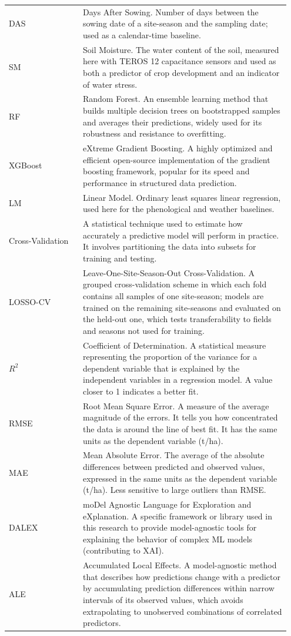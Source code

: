 \documentclass[
  english,
  review,
  number,
  sort,compress,
  authoryear,
  3p]{elsarticle}
\begin{document}
\begin{longtable}{>{\raggedright\arraybackslash}p{0.25\linewidth}>{\raggedright\arraybackslash}p{0.70\linewidth}}
DAS & Days After Sowing. Number of days between the sowing date of a site-season and the sampling date; used as a calendar-time baseline. \\
SM & Soil Moisture. The water content of the soil, measured here with TEROS 12 capacitance sensors and used as both a predictor of crop development and an indicator of water stress. \\
RF & Random Forest. An ensemble learning method that builds multiple decision trees on bootstrapped samples and averages their predictions, widely used for its robustness and resistance to overfitting. \\
XGBoost & eXtreme Gradient Boosting. A highly optimized and efficient open-source implementation of the gradient boosting framework, popular for its speed and performance in structured data prediction. \\
LM & Linear Model. Ordinary least squares linear regression, used here for the phenological and weather baselines. \\
Cross-Validation & A statistical technique used to estimate how accurately a predictive model will perform in practice. It involves partitioning the data into subsets for training and testing. \\
LOSSO-CV & Leave-One-Site-Season-Out Cross-Validation. A grouped cross-validation scheme in which each fold contains all samples of one site-season; models are trained on the remaining site-seasons and evaluated on the held-out one, which tests transferability to fields and seasons not used for training. \\
$R^2$ & Coefficient of Determination. A statistical measure representing the proportion of the variance for a dependent variable that is explained by the independent variables in a regression model. A value closer to 1 indicates a better fit. \\
RMSE & Root Mean Square Error. A measure of the average magnitude of the errors. It tells you how concentrated the data is around the line of best fit. It has the same units as the dependent variable (t/ha). \\
MAE & Mean Absolute Error. The average of the absolute differences between predicted and observed values, expressed in the same units as the dependent variable (t/ha). Less sensitive to large outliers than RMSE. \\
DALEX & moDel Agnostic Language for Exploration and eXplanation. A specific framework or library used in this research to provide model-agnostic tools for explaining the behavior of complex ML models (contributing to XAI). \\
ALE & Accumulated Local Effects. A model-agnostic method that describes how predictions change with a predictor by accumulating prediction differences within narrow intervals of its observed values, which avoids extrapolating to unobserved combinations of correlated predictors. \\
\end{longtable}
\end{document}
